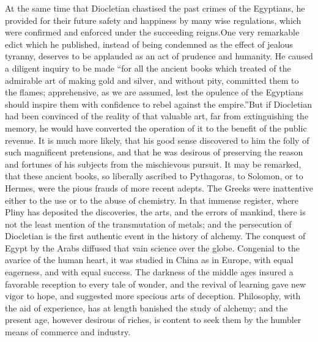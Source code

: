 
At the same time that Diocletian chastised the past crimes of the
Egyptians, he provided for their future safety and happiness by
many wise regulations, which were confirmed and enforced under
the succeeding reigns.\footnotemark[49] One very remarkable edict which he
published, instead of being condemned as the effect of jealous
tyranny, deserves to be applauded as an act of prudence and
humanity. He caused a diligent inquiry to be made “for all the
ancient books which treated of the admirable art of making gold
and silver, and without pity, committed them to the flames;
apprehensive, as we are assumed, lest the opulence of the
Egyptians should inspire them with confidence to rebel against
the empire.”\footnotemark[50] But if Diocletian had been convinced of the
reality of that valuable art, far from extinguishing the memory,
he would have converted the operation of it to the benefit of the
public revenue. It is much more likely, that his good sense
discovered to him the folly of such magnificent pretensions, and
that he was desirous of preserving the reason and fortunes of his
subjects from the mischievous pursuit. It may be remarked, that
these ancient books, so liberally ascribed to Pythagoras, to
Solomon, or to Hermes, were the pious frauds of more recent
adepts. The Greeks were inattentive either to the use or to the
abuse of chemistry. In that immense register, where Pliny has
deposited the discoveries, the arts, and the errors of mankind,
there is not the least mention of the transmutation of metals;
and the persecution of Diocletian is the first authentic event in
the history of alchemy. The conquest of Egypt by the Arabs
diffused that vain science over the globe. Congenial to the
avarice of the human heart, it was studied in China as in Europe,
with equal eagerness, and with equal success. The darkness of the
middle ages insured a favorable reception to every tale of
wonder, and the revival of learning gave new vigor to hope, and
suggested more specious arts of deception. Philosophy, with the
aid of experience, has at length banished the study of alchemy;
and the present age, however desirous of riches, is content to
seek them by the humbler means of commerce and industry.\footnotemark[51]

